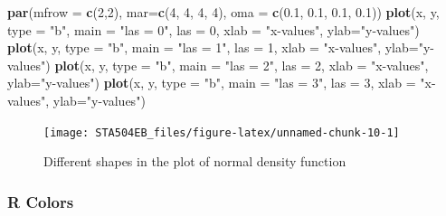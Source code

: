 \documentclass[
]{book}
\newenvironment{Shaded}{\begin{snugshade}}{\end{snugshade}}
\newcommand{\AttributeTok}[1]{\textcolor[rgb]{0.13,0.29,0.53}{#1}}
\newcommand{\DecValTok}[1]{\textcolor[rgb]{0.00,0.00,0.81}{#1}}
\newcommand{\FloatTok}[1]{\textcolor[rgb]{0.00,0.00,0.81}{#1}}
\newcommand{\FunctionTok}[1]{\textcolor[rgb]{0.13,0.29,0.53}{\textbf{#1}}}
\newcommand{\NormalTok}[1]{#1}
\newcommand{\StringTok}[1]{\textcolor[rgb]{0.31,0.60,0.02}{#1}}
\begin{document}
\begin{Shaded}
\begin{Highlighting}[]
\FunctionTok{par}\NormalTok{(}\AttributeTok{mfrow =} \FunctionTok{c}\NormalTok{(}\DecValTok{2}\NormalTok{,}\DecValTok{2}\NormalTok{), }\AttributeTok{mar=}\FunctionTok{c}\NormalTok{(}\DecValTok{4}\NormalTok{, }\DecValTok{4}\NormalTok{, }\DecValTok{4}\NormalTok{, }\DecValTok{4}\NormalTok{), }\AttributeTok{oma =} \FunctionTok{c}\NormalTok{(}\FloatTok{0.1}\NormalTok{, }\FloatTok{0.1}\NormalTok{, }\FloatTok{0.1}\NormalTok{, }\FloatTok{0.1}\NormalTok{))}
\FunctionTok{plot}\NormalTok{(x, y, }\AttributeTok{type =} \StringTok{"b"}\NormalTok{, }\AttributeTok{main =} \StringTok{"las = 0"}\NormalTok{, }\AttributeTok{las =} \DecValTok{0}\NormalTok{, }\AttributeTok{xlab =} \StringTok{"x{-}values"}\NormalTok{, }\AttributeTok{ylab=}\StringTok{"y{-}values"}\NormalTok{)}
\FunctionTok{plot}\NormalTok{(x, y, }\AttributeTok{type =} \StringTok{"b"}\NormalTok{, }\AttributeTok{main =} \StringTok{"las = 1"}\NormalTok{, }\AttributeTok{las =} \DecValTok{1}\NormalTok{, }\AttributeTok{xlab =} \StringTok{"x{-}values"}\NormalTok{, }\AttributeTok{ylab=}\StringTok{"y{-}values"}\NormalTok{)}
\FunctionTok{plot}\NormalTok{(x, y, }\AttributeTok{type =} \StringTok{"b"}\NormalTok{, }\AttributeTok{main =} \StringTok{"las = 2"}\NormalTok{, }\AttributeTok{las =} \DecValTok{2}\NormalTok{, }\AttributeTok{xlab =} \StringTok{"x{-}values"}\NormalTok{, }\AttributeTok{ylab=}\StringTok{"y{-}values"}\NormalTok{)}
\FunctionTok{plot}\NormalTok{(x, y, }\AttributeTok{type =} \StringTok{"b"}\NormalTok{, }\AttributeTok{main =} \StringTok{"las = 3"}\NormalTok{, }\AttributeTok{las =} \DecValTok{3}\NormalTok{, }\AttributeTok{xlab =} \StringTok{"x{-}values"}\NormalTok{, }\AttributeTok{ylab=}\StringTok{"y{-}values"}\NormalTok{)}
\end{Highlighting}
\end{Shaded}

\begin{figure}

{\centering \texttt{[image: STA504EB\_files/figure-latex/unnamed-chunk-10-1]} 

}

\caption{Different shapes in the plot of normal density function}\label{fig:unnamed-chunk-10}
\end{figure}

\hypertarget{r-colors}{%
\subsubsection{R Colors}\label{r-colors}}
\end{document}
